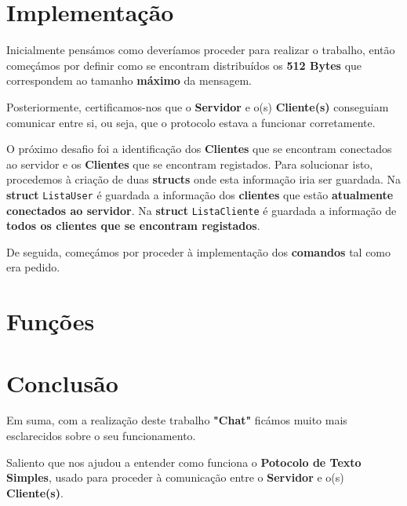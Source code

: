 \documentclass[11pt]{article}   %
\begin{document}
\section{Implementação}

\hspace{0,5cm}Inicialmente pensámos como deveríamos proceder para realizar o trabalho, então começámos por 
definir como se encontram distribuídos os \textbf{512 Bytes} que correspondem ao tamanho
\textbf{máximo} da mensagem.

Posteriormente, certificamos-nos que o \textbf{Servidor} e o(s) \textbf{Cliente(s)} conseguiam
comunicar entre si, ou seja, que o protocolo estava a funcionar corretamente.

O próximo desafio foi a identificação dos \textbf{Clientes} que se encontram conectados ao servidor
e os \textbf{Clientes} que se encontram registados. Para solucionar isto, procedemos à criação de duas
\textbf{structs} onde esta informação iria ser guardada. Na \textbf{struct} \verb|ListaUser| é guardada
a informação dos \textbf{clientes} que estão \textbf{atualmente conectados ao servidor}.
Na \textbf{struct} \verb|ListaCliente| é guardada a informação de \textbf{todos os clientes que se encontram
registados}.

De seguida, começámos por proceder à implementação dos \textbf{comandos} tal como era pedido.

\section{Funções}
\section{Conclusão} %
\hspace{0,5cm}Em suma, com a realização deste trabalho \textbf{"Chat"} ficámos muito 
mais esclarecidos sobre o seu funcionamento. \par
Saliento que nos ajudou a entender como funciona o \textbf{Potocolo de Texto Simples}, 
usado para proceder à comunicação entre o \textbf{Servidor} e o(s) \textbf{Cliente(s)}. 

\end{document}
